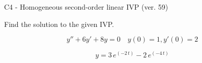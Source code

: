 \begin{exercise}
  \begin{exerciseTitle}C4 - Homogeneous second-order linear IVP (ver. 59)\end{exerciseTitle}
  \begin{exerciseStatement}
    
Find the solution to the given IVP.

    
\[y''+6y'+8y = 0 \hspace{1em} y(0) = 1 , y'(0) = 2\]

  \end{exerciseStatement}
  \begin{exerciseAnswer}
    
\[y= 3 \, e^{\left(-2 \, t\right)} - 2 \, e^{\left(-4 \, t\right)}\]

  \end{exerciseAnswer}
\end{exercise}